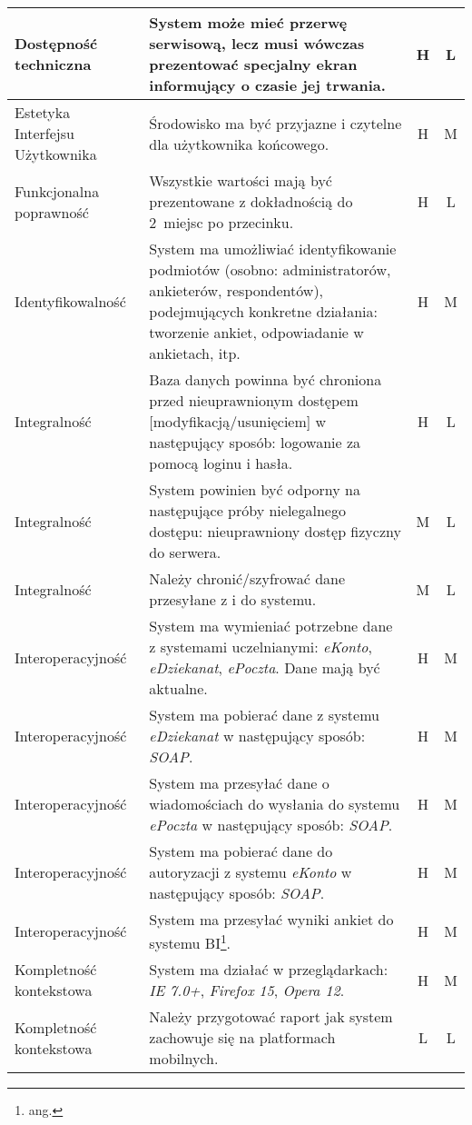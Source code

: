 \begin{center}
\begin{longtable}{ | p{4cm} | p{9cm} | c | c | }
%
Dostępność techniczna & System może mieć przerwę serwisową, lecz musi wówczas prezentować specjalny ekran informujący o czasie jej trwania. & H & L \\ \hline
%
Estetyka Interfejsu Użytkownika & Środowisko ma być przyjazne i czytelne dla użytkownika końcowego. & H & M \\ \hline
%
Funkcjonalna poprawność & Wszystkie wartości mają być prezentowane z dokładnością do 2~miejsc po przecinku. & H & L \\ \hline
%
Identyfikowalność & System ma umożliwiać identyfikowanie podmiotów (osobno: administratorów, ankieterów, respondentów), podejmujących konkretne działania: tworzenie ankiet, odpowiadanie w 
ankietach, itp. & H & M \\ \hline
%
Integralność & Baza danych powinna być chroniona przed nieuprawnionym dostępem [modyfikacją\slash usunięciem] w następujący sposób: logowanie za pomocą loginu i hasła. & H & L \\ \hline
Integralność & System powinien być odporny na następujące próby nielegalnego dostępu: nieuprawniony dostęp fizyczny do serwera. & M & L \\ \hline
Integralność & Należy chronić\slash szyfrować dane przesyłane z i do systemu. & M & L \\ \hline
%
Interoperacyjność & System ma wymieniać potrzebne dane z systemami uczelnianymi: \textit{eKonto}, \textit{eDziekanat}, \textit{ePoczta}. Dane mają być aktualne. & H & M \\ \hline
Interoperacyjność & System ma pobierać dane z systemu \textit{eDziekanat} w następujący sposób: \textit{SOAP}. & H & M \\ \hline
Interoperacyjność & System ma przesyłać dane o wiadomościach do wysłania do systemu \textit{ePoczta} w następujący sposób: \textit{SOAP}. & H & M \\ \hline
Interoperacyjność & System ma pobierać dane do autoryzacji z systemu \textit{eKonto} w następujący sposób: \textit{SOAP}. & H & M \\ \hline
Interoperacyjność & System ma przesyłać wyniki ankiet do systemu BI\footnote{ang. {Business Intelligence}}. & H & M \\ \hline
%
Kompletność kontekstowa & System ma działać w przeglądarkach: \textit{IE 7.0+}, \textit{Firefox 15}, \textit{Opera 12}. & H & M \\ \hline
Kompletność kontekstowa & Należy przygotować raport jak system zachowuje się na platformach mobilnych. & L & L \\ \hline

\end{longtable}
\end{center}
